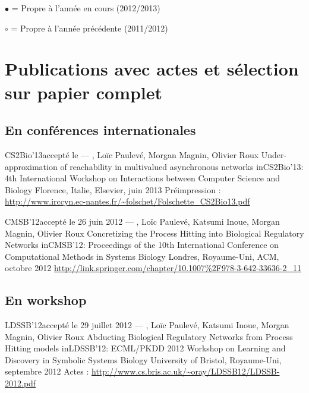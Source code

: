 $\bullet$ = Propre à l'année en cours (2012/2013)

$\circ$ = Propre à l'année précédente (2011/2012)

\section{Publications avec actes et sélection sur papier complet}
\label{sec:publications}

\subsection{En conférences internationales}

\publi
{CS2Bio'13}{accepté le  --- \cite{FPMR13-CS3Bio}}
{, Loïc Paulevé, Morgan Magnin, Olivier Roux}
{Under-approximation of reachability in multivalued asynchronous networks}
{in}{CS2Bio’13: 4th International Workshop on Interactions between Computer Science and Biology}
{Florence, Italie, Elsevier, juin 2013}
{Préimpression : \url{http://www.irccyn.ec-nantes.fr/~folschet/Folschette_CS2Bio13.pdf}}

\oldpubli
{CMSB'12}{accepté le 26 juin 2012 --- \cite{FPIMR12-CMSB}}
{, Loïc Paulevé, Katsumi Inoue, Morgan Magnin, Olivier Roux}
{Concretizing the Process Hitting into Biological Regulatory Networks}
{in}{CMSB'12: Proceedings of the 10th International Conference on Computational Methods in Systems Biology}
{Londres, Royaume-Uni, ACM, octobre 2012}
{\url{http://link.springer.com/chapter/10.1007\%2F978-3-642-33636-2_11}}


\subsection{En workshop}

\oldpubli
{LDSSB'12}{accepté le 29 juillet 2012 --- \cite{FPIMR12-LDSSB}}
{, Loïc Paulevé, Katsumi Inoue, Morgan Magnin, Olivier Roux}
{Abducting Biological Regulatory Networks from Process Hitting models}
{in}{LDSSB'12: ECML/PKDD 2012 Workshop on Learning and Discovery in Symbolic Systems Biology}
{University of Bristol, Royaume-Uni, septembre 2012}
{Actes : \url{http://www.cs.bris.ac.uk/~oray/LDSSB12/LDSSB-2012.pdf}}



